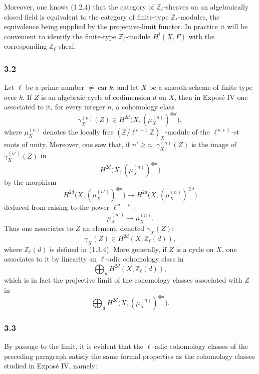 \documentclass[11pt]{article}
\providecommand{\car}{\operatorname{car}}
\providecommand{\car}{\operatorname{car}}
\providecommand{\car}{\operatorname{car}}
\begin{document}
Moreover, one knows (1.2.4) that the category of \(\mathbb Z_\ell\)-sheaves on an algebraically closed field is equivalent to the category of finite-type \(\mathbb Z_\ell\)-modules, the equivalence being supplied by the projective-limit functor. In practice it will be convenient to identify the finite-type \(\mathbb Z_\ell\)-module \(H^i(X,F)\) with the corresponding \(\mathbb Z_\ell\)-sheaf.

\subsubsection*{3.2}
Let \(\ell\) be a prime number \(\ne\car k\), and let \(X\) be a smooth scheme of finite type over \(k\). If \(Z\) is an algebraic cycle of codimension \(d\) on \(X\), then in Exposé IV one associated to it, for every integer \(n\), a cohomology class
\[
\gamma_X^{(n)}(Z)\in H^{2d}\bigl(X,(\mu_X^{(n)})^{\otimes d}\bigr),
\]
where \(\mu_X^{(n)}\) denotes the locally free \((\mathbb Z/\ell^{\,n+1}\mathbb Z)_X\)-module of the \(\ell^{\,n+1}\)-st roots of unity. Moreover, one saw that, if \(n'\ge n\), \(\gamma_X^{(n)}(Z)\) is the image of \(\gamma_X^{(n')}(Z)\) in
\[
H^{2d}\bigl(X,(\mu_X^{(n)})^{\otimes d}\bigr)
\]
by the morphism
\[
H^{2d}\bigl(X,(\mu_X^{(n')})^{\otimes d}\bigr)
\longrightarrow
H^{2d}\bigl(X,(\mu_X^{(n)})^{\otimes d}\bigr)
\]
deduced from raising to the power \(\ell^{\,n'-n}\):
\[
\mu_X^{(n')}\longrightarrow \mu_X^{(n)}.
\]
Thus one associates to \(Z\) an element, denoted \(\gamma_X(Z)\):
\[
\gamma_X(Z)\in H^{2d}(X,\mathbb Z_\ell(d)),
\]
where \(\mathbb Z_\ell(d)\) is defined in (1.3.4). More generally, if \(Z\) is a cycle on \(X\), one associates to it by linearity an \(\ell\)-adic cohomology class in
\[
\bigoplus_d H^{2d}(X,\mathbb Z_\ell(d)),
\]
which is in fact the projective limit of the cohomology classes associated with \(Z\) in
\[
\bigoplus_d H^{2d}\bigl(X,(\mu_X^{(n)})^{\otimes d}\bigr).
\]

\subsubsection*{3.3}
By passage to the limit, it is evident that the \(\ell\)-adic cohomology classes of the preceding paragraph satisfy the same formal properties as the cohomology classes studied in Exposé IV, namely:
\end{document}
